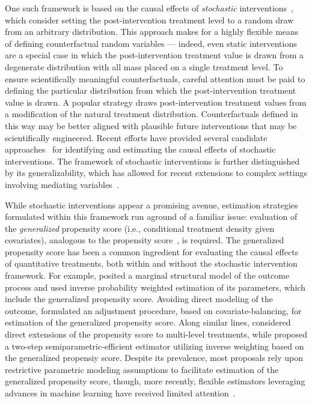 One such framework is based on the causal effects of \textit{stochastic}
interventions~\citep{stock1989nonparametric, diaz2012population,
haneuse2013estimation, vanderweele2013causal, young2014identification}, which
consider setting the post-intervention treatment level to a random draw from an
arbitrary distribution. This approach makes for a highly flexible means of
defining counterfactual random variables --- indeed, even static interventions
are a special case in which the post-intervention treatment value is drawn from
a degenerate distribution with all mass placed on a single treatment level. To
ensure scientifically meaningful counterfactuals, careful attention must be paid
to defining the particular distribution from which the post-intervention
treatment value is drawn. A popular strategy draws post-intervention treatment
values from a modification of the natural treatment distribution.
Counterfactuals defined in this way may be better aligned with plausible future
interventions that may be scientifically engineered. Recent efforts have
provided several candidate approaches~\citep{diaz2012population,
haneuse2013estimation, young2014identification, kennedy2019nonparametric} for
identifying and estimating the causal effects of stochastic interventions. The
framework of stochastic interventions is further distinguished by its
generalizability, which has allowed for recent extensions to complex settings
involving mediating variables~\citep{diaz2020causal, diaz2020nonparametric,
hejazi2020nonparametric}.

While stochastic interventions appear a promising avenue, estimation strategies
formulated within this framework run aground of a familiar issue: evaluation of
the \textit{generalized} propensity score (i.e., conditional treatment density
given covariates), analogous to the propensity
score~\citep{rosenbaum1983central}, is required. The generalized propensity
score has been a common ingredient for evaluating the causal effects of
quantitative treatments, both within and without the stochastic intervention
framework. For example, \citet{robins2000marginal} posited a marginal structural
model of the outcome process and used inverse probability weighted estimation of
its parameters, which include the generalized propensity score. Avoiding direct
modeling of the outcome, \citet{hirano2004propensity} formulated an adjustment
procedure, based on covariate-balancing, for estimation of the generalized
propensity score. Along similar lines, \citet{imai2004causal} considered direct
extensions of the propensity score to multi-level treatments, while
\citet{galvao2015uniformly} proposed a two-step semiparametric-efficient
estimator utilizing inverse weighting based on the generalized propensiy score.
Despite its prevalence, most proposals rely upon restrictive parametric modeling
assumptions to facilitate estimation of the generalized propensity score,
though, more recently, flexible estimators leveraging advances in machine
learning have received limited attention~\citep{diaz2011super, zhu2015boosting}.

